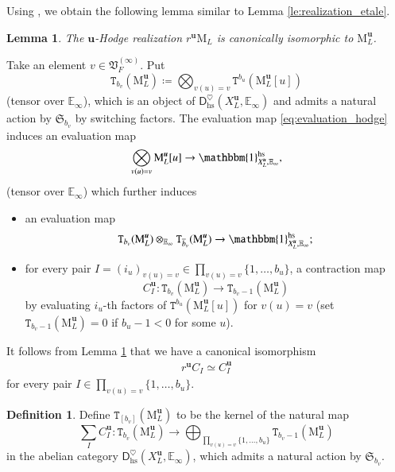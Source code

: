 \documentclass[12pt]{amsart}
\numberwithin{equation}{section}
\theoremstyle{plain}
\newtheorem{lem}[proposition]{Lemma}
\theoremstyle{definition}
\newtheorem{definition}[proposition]{Definition}
\theoremstyle{remark}
\renewcommand{\d}[1]{\mathbb{#1}}
\newcommand{\f}[1]{\mathfrak{#1}}
\renewcommand{\r}[1]{\mathrm{#1}}
\renewcommand{\sf}[1]{\mathsf{#1}}
\renewcommand{\(}{\left(}
\renewcommand{\)}{\right)}
\newcommand{\ol}[1]{\overline{#1}{}}
\newcommand{\dE}{\d E}
\newcommand{\fS}{\f S}
\newcommand{\fV}{\f V}
\newcommand{\rM}{\r M}
\newcommand{\sfD}{\sf D}
\newcommand{\tT}{\mathtt{T}}
\newcommand{\bbu}{\boldsymbol{u}}
\newcommand{\hs}{\r{hs}}
\begin{document}
Using \cite{Tub25}, we obtain the following lemma similar to Lemma \ref{le:realization_etale}.

\begin{lem}\label{le:realization_hodge}
The $\bbu$-Hodge realization $r^{\bbu}\rM_L$ is canonically isomorphic to $\rM_L^{\bbu}$.
\end{lem}

Take an element $v\in\fV_F^{(\infty)}$. Put
\[
\tT_{b_v}(\rM_L^{\bbu})\coloneqq\bigotimes_{v(u)=v}\tT^{b_u}(\rM_L^{\bbu}[u])
\]
(tensor over $\dE_\infty$), which is an object of $\sfD_{\hs}^\heartsuit(X_L^{\bbu},\dE_\infty)$ and admits a natural action by $\fS_{b_v}$ by switching factors. The evaluation map \eqref{eq:evaluation_hodge} induces an evaluation map
\[
\bigotimes_{v(u)=v}\rM_L^{\bbu}[u]\to\mathbbm{1}^\hs_{X_L^{\bbu},\dE_\infty},
\]
(tensor over $\dE_\infty$) which further induces
\begin{itemize}
  \item an evaluation map
      \begin{align*}
      \tT_{b_v}(\rM_L^{\bbu})\otimes_{\dE_\infty}\tT_{\ol{b}_v}(\rM_L^{\bbu})\to\mathbbm{1}^\hs_{X_L^{\bbu},\dE_\infty};
      \end{align*}

  \item for every pair $I=(i_u)_{v(u)=v}\in\prod_{v(u)=v}\{1,\dots,b_u\}$, a contraction map
      \[
      C_I^{\bbu}\colon \tT_{b_v}(\rM_L^{\bbu})\to\tT_{b_v-1}(\rM_L^{\bbu})
      \]
      by evaluating $i_u$-th factors of $\tT^{b_u}(\rM_L^{\bbu}[u])$ for $v(u)=v$ (set $\tT_{b_v-1}(\rM_L^{\bbu})=0$ if $b_u-1<0$ for some $u$).
\end{itemize}
It follows from Lemma \ref{le:realization_hodge} that we have a canonical isomorphism
\begin{align*}
r^{\bbu} C_I\simeq C_I^{\bbu}
\end{align*}
for every pair $I\in\prod_{v(u)=v}\{1,\dots,b_u\}$.

\begin{definition}\label{de:harmonic_hodge}
Define $\tT_{[b_v]}(\rM_L^{\bbu})$ to be the kernel of the natural map
\[
\sum_{I}C_I^{\bbu}\colon \tT_{b_v}(\rM_L^{\bbu})\to\bigoplus_{\prod_{v(u)=v}\{1,\dots,b_u\}}\tT_{b_v-1}(\rM_L^{\bbu})
\]
in the abelian category $\sfD_{\hs}^\heartsuit(X_L^{\bbu},\dE_\infty)$, which admits a natural action by $\fS_{b_v}$.
\end{definition}
\end{document}
